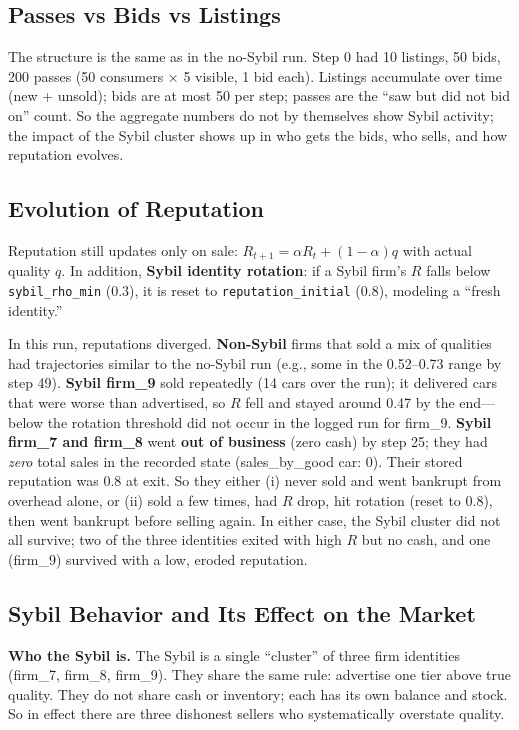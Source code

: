 \documentclass{article}
\begin{document}
\subsection{Passes vs Bids vs Listings}

The structure is the same as in the no-Sybil run. Step 0 had 10 listings, 50 bids, 200 passes (50 consumers \(\times\) 5 visible, 1 bid each). Listings accumulate over time (new + unsold); bids are at most 50 per step; passes are the ``saw but did not bid on'' count. So the aggregate numbers do not by themselves show Sybil activity; the impact of the Sybil cluster shows up in who gets the bids, who sells, and how reputation evolves.

\subsection{Evolution of Reputation}

Reputation still updates only on sale: \(R_{t+1} = \alpha R_t + (1-\alpha) q\) with actual quality \(q\). In addition, \textbf{Sybil identity rotation}: if a Sybil firm’s \(R\) falls below \texttt{sybil\_rho\_min} (0.3), it is reset to \texttt{reputation\_initial} (0.8), modeling a ``fresh identity.''

In this run, reputations diverged. \textbf{Non-Sybil} firms that sold a mix of qualities had trajectories similar to the no-Sybil run (e.g., some in the 0.52--0.73 range by step 49). \textbf{Sybil firm\_9} sold repeatedly (14 cars over the run); it delivered cars that were worse than advertised, so \(R\) fell and stayed around 0.47 by the end---below the rotation threshold did not occur in the logged run for firm\_9. \textbf{Sybil firm\_7 and firm\_8} went \textbf{out of business} (zero cash) by step 25; they had \emph{zero} total sales in the recorded state (sales\_by\_good car: 0). Their stored reputation was 0.8 at exit. So they either (i) never sold and went bankrupt from overhead alone, or (ii) sold a few times, had \(R\) drop, hit rotation (reset to 0.8), then went bankrupt before selling again. In either case, the Sybil cluster did not all survive; two of the three identities exited with high \(R\) but no cash, and one (firm\_9) survived with a low, eroded reputation.

\subsection{Sybil Behavior and Its Effect on the Market}

\textbf{Who the Sybil is.} The Sybil is a single ``cluster'' of three firm identities (firm\_7, firm\_8, firm\_9). They share the same rule: advertise one tier above true quality. They do not share cash or inventory; each has its own balance and stock. So in effect there are three dishonest sellers who systematically overstate quality.
\end{document}
